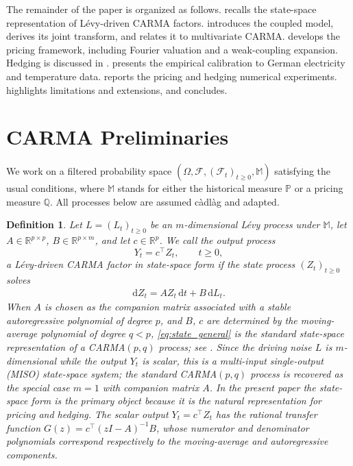 \documentclass[10pt,a4paper,reqno]{amsart}
\newtheorem{definition}[theorem]{Definition}
\newcommand{\R}{\mathbb{R}}
\newcommand{\Q}{\mathbb{Q}}
\newcommand{\PP}{\mathbb{P}}
\newcommand{\F}{\mathcal{F}}
\newcommand{\1}{\mathbbm{1}}
\newcommand{\dd}{\mathrm{d}}
\begin{document}
The remainder of the paper is organized as follows.
 recalls the state-space representation of
Lévy-driven CARMA factors.  introduces the
coupled model, derives its joint transform, and relates it to multivariate
CARMA.  develops the pricing framework,
including Fourier valuation and a weak-coupling expansion. Hedging is discussed
in .  presents the empirical
calibration to German electricity and temperature data. 
reports the pricing and hedging numerical experiments. 
highlights limitations and extensions, and  concludes.

\section{CARMA Preliminaries}\label{sec:carma-preliminaries}

We work on a filtered probability space
$(\Omega,\F,(\F_t)_{t \ge 0},\mathbb{M})$ satisfying the usual conditions,
where $\mathbb{M}$ stands for either the historical measure $\PP$ or a
pricing measure $\Q$. All processes below are assumed càdlàg and adapted.

\begin{definition}\label{def:carma-factor}
Let $L=(L_t)_{t \ge 0}$ be an $m$-dimensional Lévy process under
$\mathbb{M}$, let $A \in \R^{p \times p}$, $B \in \R^{p \times m}$, and
let $c \in \R^p$. We call the output process
$$
Y_t = c^\top Z_t,\qquad t \ge 0,
$$
a \emph{Lévy-driven CARMA factor in state-space form} if the state process
$(Z_t)_{t \ge 0}$ solves
\begin{align}\label{eq:state_general}
  \dd Z_t = A Z_t\,\dd t + B\,\dd L_t.
\end{align}
When $A$ is chosen as the companion matrix associated with a stable
autoregressive polynomial of degree $p$, and $B$, $c$ are determined by
the moving-average polynomial of degree $q < p$,
\eqref{eq:state_general} is the standard state-space
representation of a CARMA$(p,q)$ process; see \citet{Bro01}. Since the driving
noise $L$ is $m$-dimensional while the output $Y_t$ is scalar, this is a
\emph{multi-input single-output} (MISO) state-space system; the standard
CARMA$(p,q)$ process is recovered as the special case $m=1$ with companion
matrix $A$. In the present paper the state-space form is the primary object
because it is the natural representation for pricing and hedging. The scalar
output $Y_t = c^\top Z_t$ has the rational transfer function
$G(z) = c^\top(zI-A)^{-1}B$, whose numerator and denominator polynomials
correspond respectively to the moving-average and autoregressive components.
\end{definition}
\end{document}
